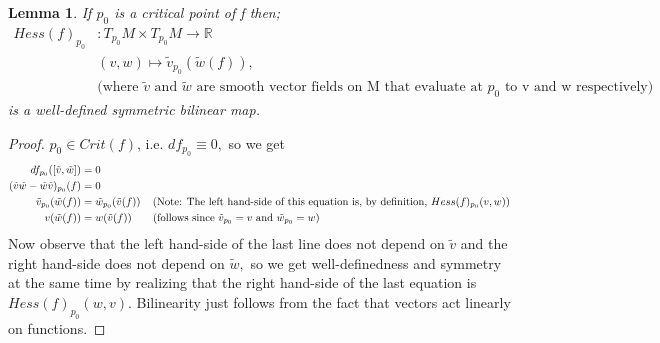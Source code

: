 \documentclass{article}
\newtheorem{lemma}[theorem]{Lemma}
\newtheorem{proposed work}[theorem]{Proposed Work}
\begin{document}
\begin{lemma}
If $p_0$ is a critical point of f then;
 \begin{align*} 
Hess(f)_{p_0}&\colon T_{p_0}M\times T_{p_0}M\to \mathbb{R} \\
&(v,w)\mapsto \tilde{v}_{p_0}(\tilde{w}(f)), \\
&\text{(where $\tilde{v}$ and $\tilde{w}$ are smooth vector fields on M that evaluate at $p_0$ to v and w respectively)}
\end{align*}
is a well-defined symmetric bilinear map.
\end{lemma}
\begin{proof}


 $p_0\in Crit(f)$, i.e. $df_{p_0}\equiv 0,$ so we get 
\begin{align*}
df_{p_0}([\tilde{v},\tilde{w}])&=0\\
(\tilde{v}\tilde{w}-\tilde{w}\tilde{v})_{p_0}(f)&=0\\
\tilde{v}_{p_0}(\tilde{w}(f))&=\tilde{w}_{p_0}(\tilde{v}(f))\hspace{4mm} \text{(Note: The left hand-side of this equation is, by definition, $Hess(f)_{p_0}(v,w)$)}\\
v(\tilde{w}(f))&=w(\tilde{v}(f)) \hspace{7mm} (\text{follows since $\tilde{v}_{p_0}=v$ and $\tilde{w}_{p_0}=w$})
\end{align*}
Now observe that the left hand-side of the last line does not depend on $\tilde{v}$ and the right hand-side does not depend on $\tilde{w},$ so we get well-definedness and symmetry at the same time by realizing that the right hand-side of the last equation is $Hess(f)_{p_0}(w,v).$ Bilinearity just follows from the fact that vectors act linearly on functions. 
\end{proof}
\end{document}
